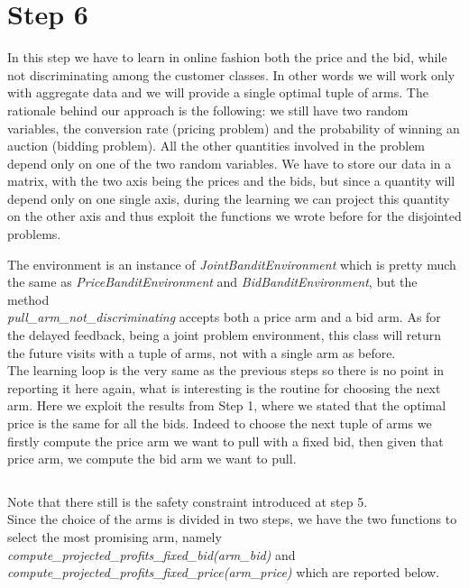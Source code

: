 \documentclass[11pt]{article} %
\begin{document}
\section{Step 6}
In this step we have to learn in online fashion both the price and the bid, while not discriminating among the customer classes. In other words we will work only with aggregate data and we will provide a single optimal tuple of arms.
The rationale behind our approach is the following: we still have two random variables, the conversion rate (pricing problem) and the probability of winning an auction (bidding problem). All the other quantities involved in the problem depend only on one of the two random variables. We have to store our data in a matrix, with the two axis being the prices and the bids, but since a quantity will depend only on one single axis, during the learning we can project this quantity on the other axis and thus exploit the functions we wrote before for the disjointed problems.

The environment is an instance of \textit{JointBanditEnvironment} which is pretty much the same as \textit{PriceBanditEnvironment}
and \textit{BidBanditEnvironment}, but the method \\ \textit{pull\_arm\_not\_discriminating} accepts both a price arm and a
bid arm.
As for the delayed feedback, being a joint problem environment, this class will return the future visits with a tuple of
arms, not with a single arm as before.\\

The learning loop is the very same as the previous steps so there is no point in reporting it here again, what is interesting is the routine for choosing the next arm. Here we exploit the results from Step 1, where we stated that the optimal price is the same for all the bids. Indeed to choose the next tuple of arms we firstly compute the price arm we want to pull with a fixed bid, then given that price arm, we compute the bid arm we want to pull.
\inputminted{python}{code/step6_choose_arm.py}
Note that there still is the safety constraint introduced at step 5.\\

Since the choice of the arms is divided in two steps, we have the two functions to select the most promising arm, namely \textit{compute\_projected\_profits\_fixed\_bid(arm\_bid)} and \textit{compute\_projected\_profits\_fixed\_price(arm\_price)} which are reported below.
\begin{samepage}
\inputminted{python}{code/step6_expected_price_fixed_bid.py}
\end{samepage}
\inputminted{python}{code/step6_expected_price_fixed_price.py}
\end{document}
